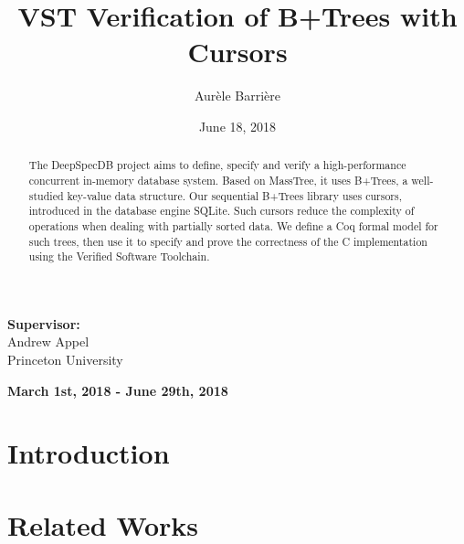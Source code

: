 \documentclass{llncs2e/llncs}
\begin{document}
\setcounter{page}{0}
\pagestyle{headings}
\title{VST Verification of B+Trees with Cursors}
\author{Aur\`ele Barri\`ere}
\date{June 18, 2018}
\maketitle
\begin{center}
  \textbf{Supervisor: }\\
  Andrew Appel
  ~\\
  Princeton University
\end{center}
\begin{center}
  \textbf{March 1st, 2018 - June 29th, 2018}
\end{center}
\vfill
\begin{abstract}
  The DeepSpecDB project aims to define, specify and verify a high-performance concurrent in-memory database system.
  Based on MassTree, it uses B+Trees, a well-studied key-value data structure.
  Our sequential B+Trees library uses cursors, introduced in the database engine SQLite.
  Such cursors reduce the complexity of operations when dealing with partially sorted data.
  We define a Coq formal model for such trees, then use it to specify and prove the correctness of the C implementation using the Verified Software Toolchain.
  
\end{abstract}
\vfill
\newpage

\def\btree{B+Tree}
\def\btrees{B+Trees}
\def\todo#1{{\color{red}#1}}
\def\btrep{\texttt{btnode\_rep}}
\newcommand{\wand}{\mathrel{-\hspace{-.7ex}*}}

%


\section{Introduction}
\label{sec:intro}


\section{Related Works}
\label{sec:related}

\end{document}
